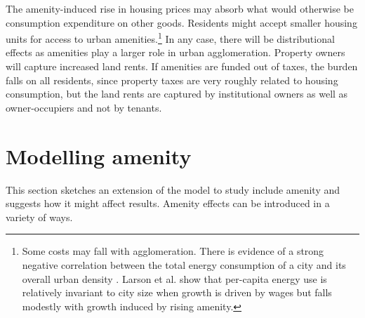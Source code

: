 The amenity-induced rise in housing prices may absorb what would otherwise be consumption expenditure on other goods. Residents might accept smaller housing units for access to urban amenities.\footnote{Some costs may fall with agglomeration. There is evidence of a strong negative correlation between the total energy consumption of a city and its overall urban density \cite{NewmanPeterJeffrey}. Larson et al. \cite{larsonEnergyImplicationsCity2015} show that per-capita energy use is relatively invariant to city size when growth is driven by wages but falls modestly with growth induced by rising amenity.} In any case, there will be distributional effects as amenities play a larger role in urban agglomeration. Property owners will capture increased land rents. If amenities are funded out of taxes, the burden falls on all residents, since property taxes are very roughly related to housing consumption, but the land rents are captured by institutional owners as well as owner-occupiers and not by tenants.



 
\section{Modelling amenity}

This section sketches an extension of the model to study include \gls{amenity} and suggests how it might affect results. Amenity effects can be introduced in a variety of ways. %

